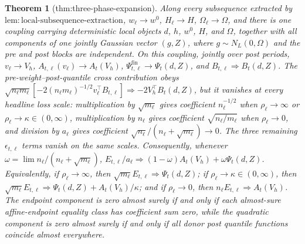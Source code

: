 \documentclass{article}
\newtheorem{theorem}{Theorem}
\begin{document}
\begin{theorem}[thm:three-phase-expansion]\label{thm:three-phase-expansion}
Along every subsequence extracted by \(\mathrm{lem:local\mbox{-}subsequence\mbox{-}extraction}\), \(w_\ell\to w^0\), \(H_\ell\to H\), \(\Omega_\ell\to\Omega\), and there is one coupling carrying deterministic local objects \(d\), \(h\), \(w^0\), \(H\), and \(\Omega\), together with all components of one jointly Gaussian vector \((g,Z)\), where \(g\sim N_L(0,\Omega)\) and the pre and post blocks are independent.  On this coupling, jointly over post periods, \(v_\ell\to V_h\), \(A_{t,\ell}(v_\ell)\to A_t(V_h)\), \(\Psi^{\mathrm{fin}}_{t,\ell}\to\Psi_t(d,Z)\), and \(B_{t,\ell}\Rightarrow B_t(d,Z)\).  The pre-weight--post-quantile cross contribution obeys \(\sqrt{n_\ell m_\ell}[-2(n_\ell m_\ell)^{-1/2}v_\ell^\top B_{t,\ell}]\Rightarrow-2V_h^\top B_t(d,Z)\), but it vanishes at every headline loss scale: multiplication by \(\sqrt{m_\ell}\) gives coefficient \(n_\ell^{-1/2}\) when \(\rho_\ell\to\infty\) or \(\rho_\ell\to\kappa\in(0,\infty)\), multiplication by \(n_\ell\) gives coefficient \(\sqrt{n_\ell/m_\ell}\) when \(\rho_\ell\to0\), and division by \(a_\ell\) gives coefficient \(\sqrt{n_\ell}/(n_\ell+\sqrt{m_\ell})\to0\).  The three remaining \(\epsilon_{t,\ell}\) terms vanish on the same scales.  Consequently, whenever \(\omega=\lim n_\ell/(n_\ell+\sqrt{m_\ell})\), \(E_{t,\ell}/a_\ell\Rightarrow(1-\omega)A_t(V_h)+\omega\Psi_t(d,Z)\).  Equivalently, if \(\rho_\ell\to\infty\), then \(\sqrt{m_\ell}E_{t,\ell}\Rightarrow\Psi_t(d,Z)\); if \(\rho_\ell\to\kappa\in(0,\infty)\), then \(\sqrt{m_\ell}E_{t,\ell}\Rightarrow\Psi_t(d,Z)+A_t(V_h)/\kappa\); and if \(\rho_\ell\to0\), then \(n_\ell E_{t,\ell}\Rightarrow A_t(V_h)\).  The endpoint component is zero almost surely if and only if each almost-sure affine-endpoint equality class has coefficient sum zero, while the quadratic component is zero almost surely if and only if all donor post quantile functions coincide almost everywhere.
\end{theorem}
\end{document}
